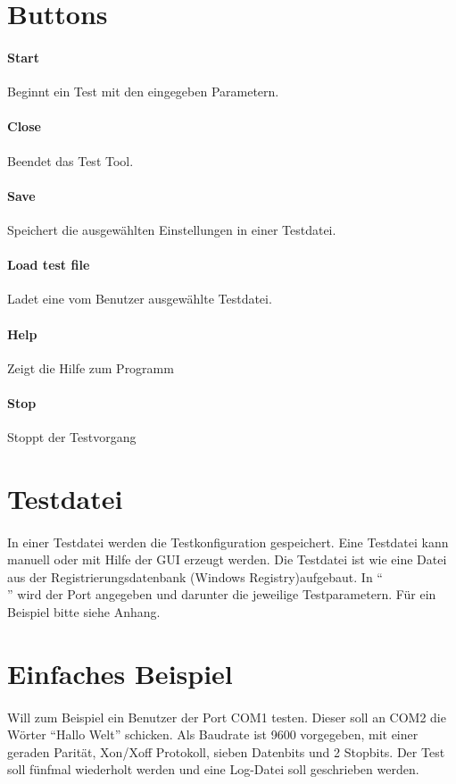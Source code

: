 \section{Buttons}
\paragraph{Start} Beginnt ein Test mit den eingegeben Parametern.
\paragraph{Close} Beendet das Test Tool.
\paragraph{Save} Speichert die ausgewählten Einstellungen in einer Testdatei.
\paragraph{Load test file} Ladet eine vom Benutzer ausgewählte Testdatei.
\paragraph{Help} Zeigt die Hilfe zum Programm
\paragraph{Stop} Stoppt der Testvorgang



\section{Testdatei}
\paragraph{}
In einer Testdatei werden die Testkonfiguration gespeichert. Eine Testdatei kann manuell oder mit Hilfe der GUI erzeugt werden. Die Testdatei ist wie eine Datei aus der Registrierungsdatenbank (Windows Registry)aufgebaut. In "`\[\]"' wird der Port angegeben und darunter die jeweilige Testparametern. Für ein Beispiel bitte siehe Anhang. 

\section{Einfaches Beispiel}
\paragraph{}
Will zum Beispiel ein Benutzer der Port COM1 testen. Dieser soll an COM2 die Wörter "`Hallo Welt"' schicken. Als Baudrate ist 9600 vorgegeben, mit einer geraden Parität, Xon/Xoff Protokoll, sieben Datenbits und 2 Stopbits. Der Test soll fünfmal wiederholt werden und eine Log-Datei soll geschrieben werden.

